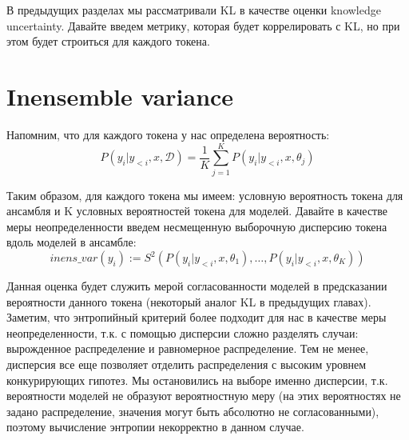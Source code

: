 \documentclass[a4paper,14pt]{extarticle}
\begin{document}
	В предыдущих разделах мы рассматривали KL в качестве оценки knowledge uncertainty. Давайте введем метрику, которая будет коррелировать с KL, но при этом будет строиться для каждого токена.

\section{Inensemble variance}
	Напомним, что для каждого токена у нас определена вероятность:
	\begin{equation*}
		P(y_i | y_{<i}, x, \mathcal{D}) = \frac1{K} \sum_{j=1}^{K}P(y_i | y_{<i}, x, \theta_j)
	\end{equation*}
	
	Таким образом, для каждого токена мы имеем: условную вероятность токена для ансамбля и K условных вероятностей токена для моделей. Давайте в качестве меры неопределенности введем несмещенную выборочную дисперсию токена вдоль моделей в ансамбле:
	\begin{equation}
		inens\_var(y_i) := S^2(P(y_i | y_{<i}, x, \theta_1), \dots, P(y_i | y_{<i}, x, \theta_K))
	\end{equation}
	
	Данная оценка будет служить мерой согласованности моделей в предсказании вероятности данного токена (некоторый аналог KL в предыдущих главах). Заметим, что энтропийный критерий более подходит для нас в качестве меры неопределенности, т.к. с помощью дисперсии сложно разделять случаи: вырожденное распределение и равномерное распределение. Тем не менее, дисперсия все еще позволяет отделить распределения с высоким уровнем конкурирующих гипотез. Мы остановились на выборе именно дисперсии, т.к. вероятности моделей не образуют вероятностную меру (на этих вероятностях не задано распределение, значения могут быть абсолютно не согласованными), поэтому вычисление энтропии некорректно в данном случае.
	
\end{document}
